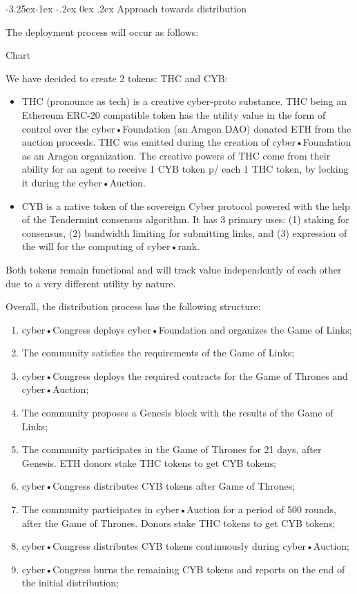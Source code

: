 \documentclass[8pt,oneside]{amsart}
\makeatletter
\renewcommand\subsection{\@startsection{subsection}{2}{\z@}%
                                     {-3.25ex\@plus -1ex \@minus -.2ex}%
                                     {0ex \@plus .2ex}%
                                     {\play\Large}}%
\newcommand{\titleSection}[1]{\subsection{#1}}
\makeatother
\begin{document}
\begin{Abstract}
\titleSection{Approach towards distribution}\label{Approach towards distribution}

The deployment process will occur as follows:

Chart

We have decided to create 2 tokens: THC and CYB:

\begin{itemize}
\item THC (pronounce as tech) is a creative cyber-proto substance. THC being an Ethereum ERC-20 compatible token has the utility value in the form of control over the cyber•Foundation (an Aragon DAO) donated ETH from the auction proceeds. THC was emitted during the creation of cyber•Foundation as an Aragon organization. The creative powers of THC come from their ability for an agent to receive 1 CYB token p/ each 1 THC token, by locking it during the cyber•Auction.
\item CYB is a native token of the sovereign Cyber protocol powered with the help of the Tendermint consensus algorithm. It has 3 primary uses: (1) staking for consensus, (2) bandwidth limiting for submitting links, and (3) expression of the will for the computing of cyber•rank.
\end{itemize}

Both tokens remain functional and will track value independently of each other due to a very different utility by nature.

Overall, the distribution process has the following structure:

\begin{enumerate}
 \item cyber•Congress deploys cyber•Foundation and organizes the Game of Links;
 \item The community satisfies the requirements of the Game of Links;
 \item cyber•Congress deploys the required contracts for the Game of Thrones and cyber•Auction;
 \item The community proposes a Genesis block with the results of the Game of Links;
 \item The community participates in the Game of Thrones for 21 days, after Genesis. ETH donors stake THC tokens to get CYB tokens;
 \item cyber•Congress distributes CYB tokens after Game of Thrones;
 \item The community participates in cyber•Auction for a period of 500 rounds, after the Game of Thrones. Donors stake THC tokens to get CYB tokens;
 \item cyber•Congress distributes CYB tokens continuously during cyber•Auction;
 \item cyber•Congress burns the remaining CYB tokens and reports on the end of the initial distribution;
\end{enumerate}


\end{Abstract}
\end{document}
